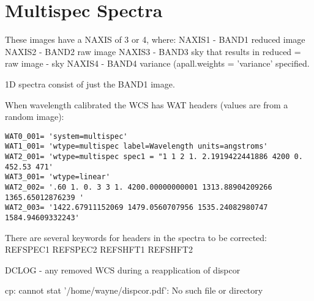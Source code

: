 \section{Multispec Spectra}

These images have a NAXIS of 3 or 4, where:
NAXIS1 - BAND1 reduced image
NAXIS2 - BAND2 raw image
NAXIS3 - BAND3 sky that results in reduced = raw image - sky
NAXIS4 - BAND4 variance (apall.weights = 'variance' specified.

1D spectra consist of just the BAND1 image.

When wavelength calibrated the WCS has WAT headers (values are from
a random image):

\begingroup \fontsize{10pt}{10pt}
\selectfont
\begin{verbatim} 
WAT0_001= 'system=multispec'
WAT1_001= 'wtype=multispec label=Wavelength units=angstroms'
WAT2_001= 'wtype=multispec spec1 = "1 1 2 1. 2.1919422441886 4200 0. 452.53 471'
WAT3_001= 'wtype=linear'
WAT2_002= '.60 1. 0. 3 3 1. 4200.00000000001 1313.88904209266 1365.65012876239 '
WAT2_003= '1422.67911152069 1479.0560707956 1535.24082980747 1584.94609332243'
\end{verbatim}
\endgroup

There are several keywords for headers in the spectra to be corrected:
REFSPEC1
REFSPEC2
REFSHFT1
REFSHFT2



DCLOG - any removed WCS during a reapplication of dispcor

cp: cannot stat '/home/wayne/dispcor.pdf': No such file or directory
